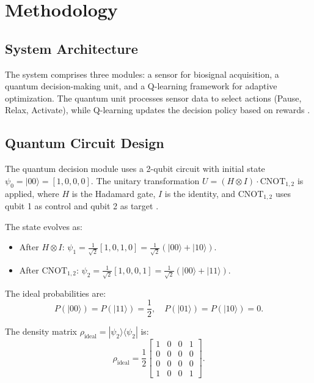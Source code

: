 \documentclass[12pt]{article}
\begin{document}
\section{Methodology}

\subsection{System Architecture}
The system comprises three modules: a sensor for biosignal acquisition, a quantum decision-making unit, and a Q-learning framework for adaptive optimization. The quantum unit processes sensor data to select actions (Pause, Relax, Activate), while Q-learning updates the decision policy based on rewards \citep{sutton1998reinforcement}.

\subsection{Quantum Circuit Design}
The quantum decision module uses a 2-qubit circuit with initial state $\psi_0 = |00\rangle = [1, 0, 0, 0]$. The unitary transformation $U = (H \otimes I) \cdot \text{CNOT}_{1,2}$ is applied, where $H$ is the Hadamard gate, $I$ is the identity, and $\text{CNOT}_{1,2}$ uses qubit 1 as control and qubit 2 as target \citep{nielsen2010quantum}.

The state evolves as:
\begin{itemize}
    \item After $H \otimes I$: $\psi_1 = \frac{1}{\sqrt{2}}[1, 0, 1, 0] = \frac{1}{\sqrt{2}}(|00\rangle + |10\rangle)$.
    \item After $\text{CNOT}_{1,2}$: $\psi_2 = \frac{1}{\sqrt{2}}[1, 0, 0, 1] = \frac{1}{\sqrt{2}}(|00\rangle + |11\rangle)$.
\end{itemize}

The ideal probabilities are:
\[
P(|00\rangle) = P(|11\rangle) = \frac{1}{2}, \quad P(|01\rangle) = P(|10\rangle) = 0.
\]

The density matrix $\rho_{\text{ideal}} = |\psi_2\rangle\langle\psi_2|$ is:
\[
\rho_{\text{ideal}} = \frac{1}{2} \begin{bmatrix} 1 & 0 & 0 & 1 \\ 0 & 0 & 0 & 0 \\ 0 & 0 & 0 & 0 \\ 1 & 0 & 0 & 1 \end{bmatrix}.
\]
\end{document}
